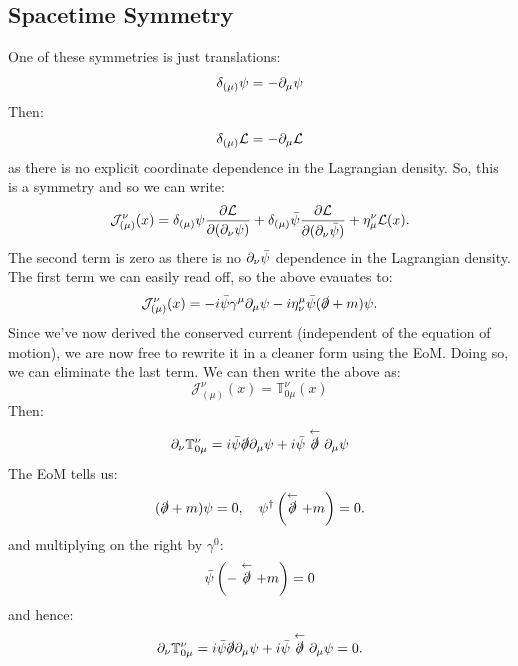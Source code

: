 \subsection{Spacetime Symmetry}
One of these symmetries is just translations:
\begin{equation}
    \delta_{(\mu)}\psi = -\partial_\mu \psi
\end{equation}
Then:
\begin{equation}
    \delta_{(\mu)}\mathcal{L} = -\partial_\mu \mathcal{L}
\end{equation}
as there is no explicit coordinate dependence in the Lagrangian density. So, this is a symmetry and so we can write:
\begin{equation}
    \mathcal{J}_{(\mu)}^\nu(x) = \delta_{(\mu)}\psi \frac{\partial \mathcal{L}}{\partial (\partial_\nu \psi)} + \delta_{(\mu)} \bar{\psi}\frac{\partial \mathcal{L}}{\partial (\partial_\nu\bar{\psi})} + \eta^{\nu}_\mu \mathcal{L}(x).
\end{equation}
The second term is zero as there is no $\partial_\nu \bar{\psi}$ dependence in the Lagrangian density. The first term we can easily read off, so the above evauates to:
\begin{equation}
    \mathcal{J}_{(\mu)}^\nu(x) = -i\bar{\psi}\gamma^\mu \partial_\mu \psi - i\eta^{\mu}_\nu \bar{\psi}(\slashed{\partial} + m)\psi.
\end{equation}
Since we've now derived the conserved current (independent of the equation of motion), we are now free to rewrite it in a cleaner form using the EoM. Doing so, we can eliminate the last term. We can then write the above as:
\begin{equation}
    \mathcal{J}_{(\mu)}^\nu(x) = \mathbb{T}_{0\mu}^{\nu}(x)
\end{equation}
Then:
\begin{equation}
    \partial_\nu \mathbb{T}^\nu_{0\mu} = i\bar{\psi}\slashed{\partial} \partial_\mu \psi + i\bar{\psi}\stackrel{\leftarrow}{\slashed{\partial}}\partial_\mu \psi
\end{equation}
The EoM tells us:
\begin{equation}
    (\slashed{\partial} + m)\psi = 0, \quad \psi^\dagger\left(\stackrel{\leftarrow}{\slashed{\partial}} + m\right) = 0.
\end{equation}
and multiplying on the right by $\gamma^0$:
\begin{equation}
    \bar{\psi}\left(-\stackrel{\leftarrow}{\slashed{\partial}} + m\right) = 0
\end{equation}
and hence:
\begin{equation}
    \partial_\nu \mathbb{T}^\nu_{0\mu} = i\bar{\psi}\slashed{\partial} \partial_\mu \psi + i\bar{\psi}\stackrel{\leftarrow}{\slashed{\partial}}\partial_\mu \psi = 0.
\end{equation}

